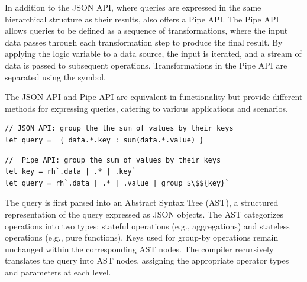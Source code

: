 \documentclass[acmsmall,nonacm]{acmart}\settopmatter{printfolios=true,printccs=false,printacmref=false}
\newcommand{\rhyme}{\text{Rhyme}\xspace}
\begin{document}
In addition to the JSON API, where queries are expressed in the same hierarchical structure as their results, \rhyme also offers a Pipe API. The Pipe API allows queries to be defined as a sequence of transformations, where the input data passes through each transformation step to produce the final result. By applying the logic variable  to a data source, the input is iterated, and a stream of data is passed to subsequent operations. Transformations in the Pipe API are separated using the \inline{|} symbol.

The JSON API and Pipe API are equivalent in functionality but provide different methods for expressing queries, catering to various applications and scenarios.\par
\vspace*{1pt}
\noindent
\begin{minipage}{0.5\textwidth}\label{jsonapi}
\begin{lstlisting}
// JSON API: group the the sum of values by their keys
let query =  { data.*.key : sum(data.*.value) }
\end{lstlisting}
\end{minipage}%
\begin{minipage}{0.5\textwidth}
\begin{lstlisting}
//  Pipe API: group the sum of values by their keys
let key = rh`.data | .* | .key`
let query = rh`.data | .* | .value | group $\$${key}`
\end{lstlisting}
\end{minipage}
\vspace*{1pt}

The \rhyme query is first parsed into an Abstract Syntax Tree (AST), a structured representation of the query expressed as JSON objects. The \rhyme AST categorizes operations into two types: stateful operations (e.g., aggregations) and stateless operations (e.g., pure functions). Keys used for group-by operations remain unchanged within the corresponding AST nodes. The \rhyme compiler recursively translates the query into AST nodes, assigning the appropriate operator types and parameters at each level.
\end{document}
